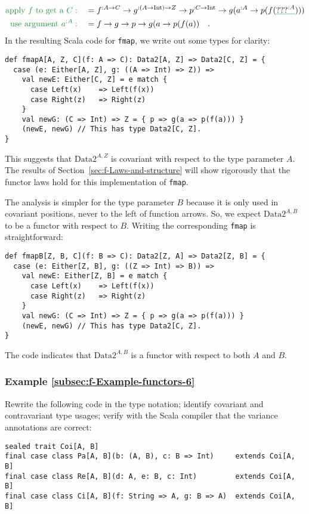 \begin{align*}
{\color{greenunder}\text{apply }f\text{ to get a }C:}\quad & =f^{:A\rightarrow C}\rightarrow g^{:\left(A\rightarrow\text{Int}\right)\rightarrow Z}\rightarrow p^{:C\rightarrow\text{Int}}\rightarrow g(a^{:A}\rightarrow p(f(\gunderline{\text{???}^{:A}})))\\
{\color{greenunder}\text{use argument }a^{:A}:}\quad & =f\rightarrow g\rightarrow p\rightarrow g(a\rightarrow p(f(a))\quad.
\end{align*}
In the resulting Scala code for \lstinline!fmap!, we write out some
types for clarity:
\begin{lstlisting}
def fmapA[A, Z, C](f: A => C): Data2[A, Z] => Data2[C, Z] = {
  case (e: Either[A, Z], g: ((A => Int) => Z)) =>
    val newE: Either[C, Z] = e match {
      case Left(x)    => Left(f(x))
      case Right(z)   => Right(z)
    }
    val newG: (C => Int) => Z = { p => g(a => p(f(a))) }
    (newE, newG) // This has type Data2[C, Z].
}
\end{lstlisting}
This suggests that $\text{Data2}^{A,Z}$ is covariant with respect
to the type parameter $A$. The results of Section~\ref{sec:f-Laws-and-structure}
will show rigorously that the functor laws hold for this implementation
of \lstinline!fmap!.

The analysis is simpler for the type parameter $B$ because it is
only used in covariant positions, never to the left of function arrows.
So, we expect $\text{Data2}^{A,B}$ to be a functor with respect to
$B$. Writing the corresponding \lstinline!fmap! is straightforward:
\begin{lstlisting}
def fmapB[Z, B, C](f: B => C): Data2[Z, A] => Data2[Z, B] = {
  case (e: Either[Z, B], g: ((Z => Int) => B)) =>
    val newE: Either[Z, B] = e match {
      case Left(x)    => Left(f(x))
      case Right(z)   => Right(z)
    }
    val newG: (C => Int) => Z = { p => g(a => p(f(a))) }
    (newE, newG) // This has type Data2[C, Z].
}
\end{lstlisting}

The code indicates that $\text{Data2}^{A,B}$ is a functor with respect
to both $A$ and $B$.

\subsubsection{Example \label{subsec:f-Example-functors-6}\ref{subsec:f-Example-functors-6}}

Rewrite the following code in the type notation; identify covariant
and contravariant type usages; verify with the Scala compiler that
the variance annotations are correct:
\begin{lstlisting}
sealed trait Coi[A, B]
final case class Pa[A, B](b: (A, B), c: B => Int)     extends Coi[A, B]
final case class Re[A, B](d: A, e: B, c: Int)         extends Coi[A, B]
final case class Ci[A, B](f: String => A, g: B => A)  extends Coi[A, B]
\end{lstlisting}


